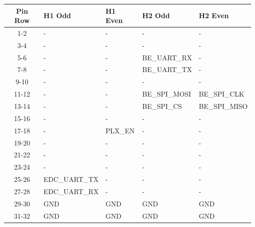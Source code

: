 \begin{table}[!h]
    \centering
    \begin{tabular}{cllll}
        \toprule[1.5pt]
        \textbf{Pin Row}   & \textbf{H1 Odd}  & \textbf{H1 Even} & \textbf{H2 Odd} & \textbf{H2 Even} \\
        \midrule
        1-2                & -                & -                & -               & -                \\
        3-4                & -                & -                & -               & -                \\
        5-6                & -                & -                & BE\_UART\_RX    & -                \\
        7-8                & -                & -                & BE\_UART\_TX    & -                \\
        9-10               & -                & -                & -               & -                \\
        11-12              & -                & -                & BE\_SPI\_MOSI   & BE\_SPI\_CLK     \\
        13-14              & -                & -                & BE\_SPI\_CS     & BE\_SPI\_MISO    \\
        15-16              & -                & -                & -               & -                \\
        17-18              & -                & PLX\_EN          & -               & -                \\
        19-20              & -                & -                & -               & -                \\
        21-22              & -                & -                & -               & -                \\
        23-24              & -                & -                & -               & -                \\
        25-26              & EDC\_UART\_TX    & -                & -               & -                \\
        27-28              & EDC\_UART\_RX    & -                & -               & -                \\
        29-30              & GND              & GND              & GND             & GND              \\
        31-32              & GND              & GND              & GND             & GND              \\

\end{tabular}
\end{table}
